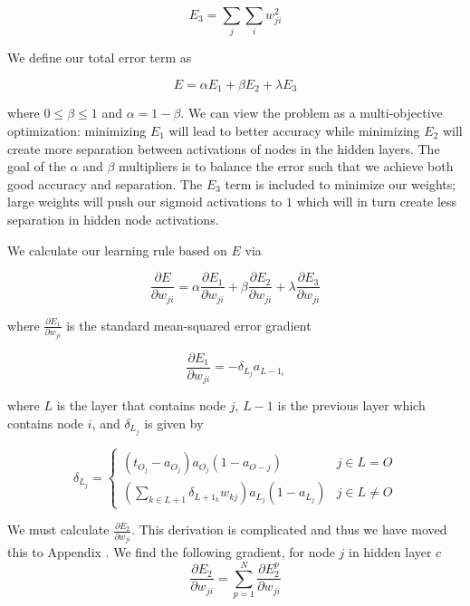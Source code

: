 \begin{equation}
  E_3 = \sum_{j} \sum_{i} w_{ji}^2
\end{equation}

We define our total error term as

\begin{equation}
  E = \alpha E_1 + \beta E_2 + \lambda E_3
\end{equation}

where $0 \leq \beta \leq 1$ and $\alpha = 1 - \beta$.
We can view the problem as a multi-objective optimization:
minimizing $E_1$ will lead to better accuracy while
minimizing $E_2$ will create more separation between activations of
nodes in the hidden layers. The goal of the $\alpha$ and $\beta$
multipliers is to balance the error such that we achieve
both good accuracy and separation. The $E_3$ term is included
to minimize our weights; large weights will push our sigmoid
activations to $1$ which will in turn create less separation in
hidden node activations.

We calculate our learning rule based on $E$ via

\begin{equation}
  \frac{\partial E}{\partial w_{ji}} = \alpha \frac{\partial E_1}{\partial w_{ji}} + \beta \frac{\partial E_2}{\partial w_{ji}} + \lambda \frac{\partial E_3}{\partial w_{ji}}
\end{equation}

where $\frac{\partial E_1}{\partial w_{ji}}$ is the standard mean-squared error gradient

\begin{equation}
  \frac{\partial E_1}{\partial w_{ji}} = -\delta_{L_j}a_{L-1_i} 
\end{equation}

where $L$ is the layer that contains node $j$, $L-1$ is the previous layer
which contains node $i$, and $\delta_{L_j}$ is given by

\begin{equation}
  \delta_{L_j} =
  \begin{cases}
    (t_{O_j} - a_{O_j})a_{O_j}(1-a_{O-j}) & j \in L = O \\
    (\sum_{k \in L+1}{\delta_{L+1_k}w_{kj}})a_{L_j}(1-a_{L_j}) & j \in L \neq O
  \end{cases}
\end{equation}

We must calculate $\frac{\partial E_2}{\partial w_{ji}}$. This derivation is
complicated and thus we have moved this to Appendix
.
We find the following gradient, for node $j$ in hidden layer $c$
\begin{equation}
    \frac{\partial E_2}{\partial w_{ji}} = \sum_{p=1}^N \frac{\partial E_2^p}{\partial w_{ji}}
\end{equation}

